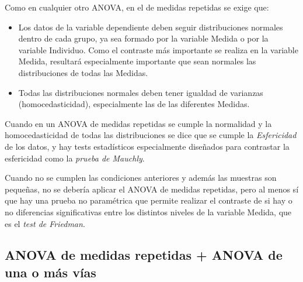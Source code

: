 \documentclass[
  spanish,
  a4paper,
]{scrreport}
\theoremstyle{plain}
\theoremstyle{definition}
\theoremstyle{definition}
\theoremstyle{remark}
\begin{document}
Como en cualquier otro ANOVA, en el de medidas repetidas se exige que:

\begin{itemize}
\item
  Los datos de la variable dependiente deben seguir distribuciones
  normales dentro de cada grupo, ya sea formado por la variable Medida o
  por la variable Individuo. Como el contraste más importante se realiza
  en la variable Medida, resultará especialmente importante que sean
  normales las distribuciones de todas las Medidas.
\item
  Todas las distribuciones normales deben tener igualdad de varianzas
  (homocedasticidad), especialmente las de las diferentes Medidas.
\end{itemize}

Cuando en un ANOVA de medidas repetidas se cumple la normalidad y la
homocedasticidad de todas las distribuciones se dice que se cumple la
\emph{Esfericidad} de los datos, y hay tests estadísticos especialmente
diseñados para contrastar la esfericidad como la \emph{prueba de
Mauchly}.

Cuando no se cumplen las condiciones anteriores y además las muestras
son pequeñas, no se debería aplicar el ANOVA de medidas repetidas, pero
al menos sí que hay una prueba no paramétrica que permite realizar el
contraste de si hay o no diferencias significativas entre los distintos
niveles de la variable Medida, que es el \emph{test de Friedman}.

\subsection{ANOVA de medidas repetidas + ANOVA de una o más
vías}\label{anova-de-medidas-repetidas-anova-de-una-o-muxe1s-vuxedas}
\end{document}
